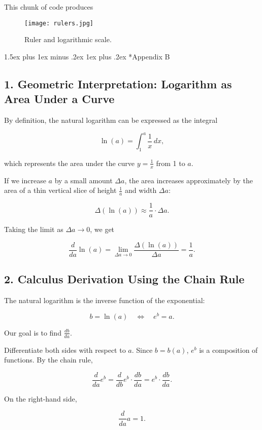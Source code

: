 \documentclass[10pt,twocolumn]{article}
\makeatletter
\renewcommand\section{%
  \@startsection{section}{1}{0pt}%
  {1.5ex plus 1ex minus .2ex}%
  {1ex plus .2ex}%
  {\normalfont\normalsize\bfseries}} %
\makeatother
\begin{document}
This chunk of code produces

\begin{figure}[h]
  \centering
  \texttt{[image: rulers.jpg]}  %
  \caption{Ruler and logarithmic scale.}
  \label{fig:rulers}
\end{figure}

\section*{Appendix B}
\subsection*{1. Geometric Interpretation: Logarithm as Area Under a Curve}

By definition, the natural logarithm can be expressed as the integral

\[
\ln(a) = \int_1^a \frac{1}{x} \, dx,
\]

which represents the area under the curve \(y = \frac{1}{x}\) from 1 to \(a\).

If we increase \(a\) by a small amount \(\Delta a\), the area increases approximately by the area of a thin vertical slice of height \(\frac{1}{a}\) and width \(\Delta a\):

\[
\Delta (\ln(a)) \approx \frac{1}{a} \cdot \Delta a.
\]

Taking the limit as \(\Delta a \to 0\), we get

\[
\frac{d}{da} \ln(a) = \lim_{\Delta a \to 0} \frac{\Delta(\ln(a))}{\Delta a} = \frac{1}{a}.
\]

\subsection*{2. Calculus Derivation Using the Chain Rule}

The natural logarithm is the inverse function of the exponential:

\[
b = \ln(a) \quad \iff \quad e^b = a.
\]

Our goal is to find \(\frac{db}{da}\).

Differentiate both sides with respect to \(a\). Since \(b = b(a)\), \(e^b\) is a composition of functions. By the chain rule,

\[
\frac{d}{da} e^b = \frac{d}{db} e^b \cdot \frac{db}{da} = e^b \cdot \frac{db}{da}.
\]

On the right-hand side,

\[
\frac{d}{da} a = 1.
\]
\end{document}
